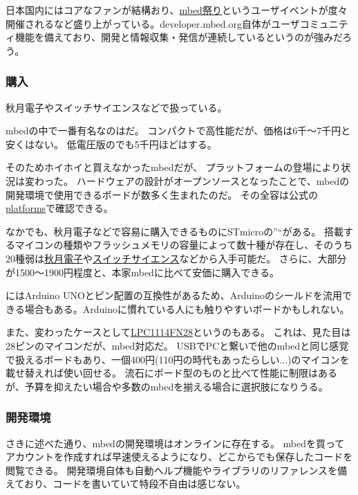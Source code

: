 \documentclass[letterpaper,10pt,dvipdfmx]{sphinxmanual}
\begin{document}
日本国内にはコアなファンが結構おり、\href{https://mbed.doorkeeper.jp/}{mbed祭り}というユーザイベントが度々開催されるなど盛り上がっている。developer.mbed.org自体がユーザコミュニティ機能を備えており、開発と情報収集・発信が連続しているというのが強みだろう。


\subsubsection{購入}
\label{\detokenize{begginers/microcontroller:id8}}
秋月電子やスイッチサイエンスなどで扱っている。

mbedの中で一番有名なのはだ。
コンパクトで高性能だが、価格は6千〜7千円と安くはない。
低電圧版のでも5千円ほどはする。

そのためホイホイと買えなかったmbedだが、
プラットフォームの登場により状況は変わった。
ハードウェアの設計がオープンソースとなったことで、mbedの開発環境で使用できるボードが数多く生まれたのだ。
その全容は公式の\href{https://developer.mbed.org/platforms/}{platforms}で確認できる。

なかでも、秋月電子などで容易に購入できるものにSTmicroの''``がある。
搭載するマイコンの種類やフラッシュメモリの容量によって数十種が存在し、そのうち20種弱は\href{http://akizukidenshi.com/catalog/c/cstm32/}{秋月電子}や\href{https://www.switch-science.com/catalog/list/615/}{スイッチサイエンス}などから入手可能だ。
さらに、大部分が1500〜1900円程度と、本家mbedに比べて安価に購入できる。

にはArduino
UNOとピン配置の互換性があるため、Arduinoのシールドを流用できる場合もある。Arduinoに慣れている人にも触りやすいボードかもしれない。

また、変わったケースとして\href{http://akizukidenshi.com/catalog/g/gI-06071/}{LPC1114FN28}というのもある。
これは、見た目は28ピンのマイコンだが、mbed対応だ。
USBでPCと繋いで他のmbedと同じ感覚で扱えるボードもあり、一個400円(110円の時代もあったらしい...)のマイコンを載せ替えれば使い回せる。
流石にボード型のものと比べて性能に制限はあるが、予算を抑えたい場合や多数のmbedを揃える場合に選択肢になりうる。


\subsubsection{開発環境}
\label{\detokenize{begginers/microcontroller:id9}}
さきに述べた通り、mbedの開発環境はオンラインに存在する。
mbedを買ってアカウントを作成すれば早速使えるようになり、どこからでも保存したコードを閲覧できる。
開発環境自体も自動ヘルプ機能やライブラリのリファレンスを備えており、コードを書いていて特段不自由は感じない。
\end{document}
